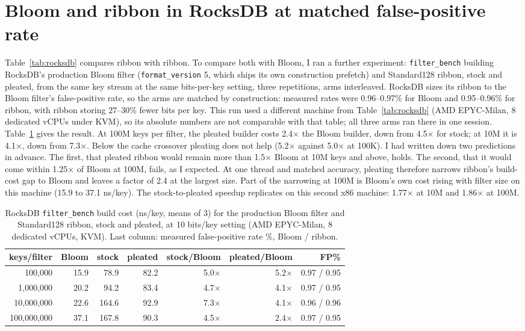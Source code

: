 \documentclass[a4paper,UKenglish,cleveref,autoref,thm-restate,anonymous]{lipics-v2021}
\begin{document}
\section{Bloom and ribbon in RocksDB at matched false-positive rate}\label{app:ethree}
Table~\ref{tab:rocksdb} compares
ribbon with ribbon. To compare both with Bloom, I ran a further experiment:
\texttt{filter\_bench} building RocksDB's production Bloom filter
(\texttt{format\_version} 5, which ships its own construction prefetch) and Standard128 ribbon,
stock and pleated, from the same key stream at the same bits-per-key setting, three repetitions,
arms interleaved. RocksDB sizes its ribbon to the Bloom filter's false-positive rate, so the arms
are matched by construction: measured rates were 0.96--0.97\% for Bloom and 0.95--0.96\% for
ribbon, with ribbon storing 27--30\% fewer bits per key. This run used a different machine from
Table~\ref{tab:rocksdb} (AMD EPYC-Milan, 8 dedicated vCPUs under KVM), so its absolute numbers are
not comparable with that table; all three arms ran there in one session.
Table~\ref{tab:ethree} gives the result. At 100M keys per filter, the pleated builder costs
2.4$\times$ the Bloom builder, down from 4.5$\times$ for stock; at 10M it is 4.1$\times$, down from
7.3$\times$. Below the cache crossover pleating does not help (5.2$\times$ against 5.0$\times$ at
100K). I had written down two predictions in advance. The first, that pleated ribbon would remain
more than 1.5$\times$ Bloom at 10M keys and above, holds. The second, that it would come within
1.25$\times$ of Bloom at 100M, fails, as I expected. At one thread and matched accuracy,
pleating therefore narrows ribbon's build-cost gap to Bloom and leaves a factor of 2.4 at the largest size.
Part of the narrowing at 100M is Bloom's own cost rising with filter size on this machine (15.9 to
37.1 ns/key). The stock-to-pleated speedup replicates on this second x86 machine: 1.77$\times$ at
10M and 1.86$\times$ at 100M.

\begin{table}
\caption{RocksDB \texttt{filter\_bench} build cost (ns/key, means of 3) for the production Bloom
filter and Standard128 ribbon, stock and pleated, at 10 bits/key setting (AMD EPYC-Milan, 8 dedicated vCPUs, KVM). Last column: measured
false-positive rate \%, Bloom / ribbon.}
\label{tab:ethree}
\begin{tabular}{rrrrrrr}
\toprule
keys/filter & Bloom & stock & pleated & stock/Bloom & pleated/Bloom & FP\% \\
\midrule
100,000 & 15.9 & 78.9 & 82.2 & 5.0$\times$ & 5.2$\times$ & 0.97 / 0.95 \\
1,000,000 & 20.2 & 94.2 & 83.4 & 4.7$\times$ & 4.1$\times$ & 0.97 / 0.95 \\
10,000,000 & 22.6 & 164.6 & 92.9 & 7.3$\times$ & 4.1$\times$ & 0.96 / 0.96 \\
100,000,000 & 37.1 & 167.8 & 90.3 & 4.5$\times$ & 2.4$\times$ & 0.97 / 0.95 \\
\bottomrule
\end{tabular}
\end{table}
\end{document}
